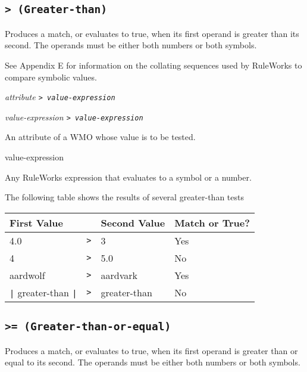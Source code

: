 \subsection{\tt> (Greater-than)}

Produces a match, or evaluates to true, when its first operand is
greater than its second. The operands must be either both numbers or
both symbols.

See Appendix E for information on the collating sequences used by
RuleWorks to compare symbolic values.

\Format

\ct\it{attribute} \tt> \it{value-expression}

\it{value-expression} \tt> \it{value-expression}

\begin{operands}
\item[\ct{attribute}]

  An attribute of a WMO whose value is to be tested.

\item[value-expression]

  Any RuleWorks expression that evaluates to a symbol or a number.
\end{operands}

\Example

The following table shows the results of several greater-than tests

\begin{center}
\begin{tabular}{lcll}
  \toprule
  First Value      &   & Second Value & Match or True? \\
  \midrule
  4.0              & \verb|>| & 3            & Yes            \\
  4                & \verb|>| & 5.0          & No             \\
  aardwolf         & \verb|>| & aardvark     & Yes            \\
  \verb,|, greater-than \verb,|, & \verb|>| & greater-than & No             \\
  \bottomrule
\end{tabular}
\end{center}

\subsection{\tt{>=} (Greater-than-or-equal)}

Produces a match, or evaluates to true, when its first operand is
greater than or equal to its second. The operands must be either both
numbers or both symbols.

